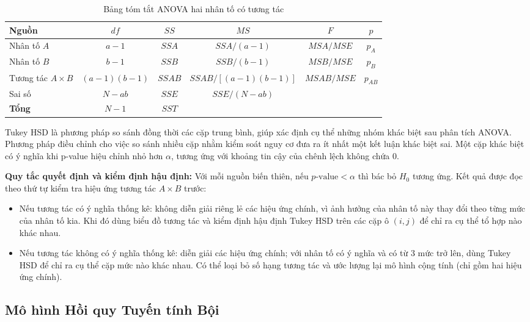 	\begin{table}[htbp]
		\centering
		\vspace{4pt}
		\renewcommand{\arraystretch}{1.6}
		\small
		\begin{tabular}{|l|c|c|c|c|c|}
			\hline
			\textbf{Nguồn} & $df$ & $SS$ & $MS$ & $F$ & $p$ \\ 
			\hline
			Nhân tố $A$ & $a - 1$ & $SSA$ & $SSA/(a-1)$ & $MSA/MSE$ & $p_A$ \\ \hline
			Nhân tố $B$ & $b - 1$ & $SSB$ & $SSB/(b-1)$ & $MSB/MSE$ & $p_B$ \\ \hline
			Tương tác $A \times B$ & $(a-1)(b-1)$ & $SSAB$ & $SSAB/[(a-1)(b-1)]$ & $MSAB/MSE$ & $p_{AB}$ \\ \hline
			Sai số & $N - ab$ & $SSE$ & $SSE/(N-ab)$ & & \\ \hline
			\textbf{Tổng} & $N - 1$ & $SST$ & & & \\ \hline
		\end{tabular}
		\caption{Bảng tóm tắt ANOVA hai nhân tố có tương tác}
		\label{tab:anova2}
	\end{table}
	
	Tukey HSD là phương pháp so sánh đồng thời các cặp trung bình, giúp xác định cụ thể những nhóm khác biệt sau phân tích ANOVA. Phương pháp điều chỉnh cho việc so sánh nhiều cặp nhằm kiểm soát nguy cơ đưa ra ít nhất một kết luận khác biệt sai. Một cặp khác biệt có ý nghĩa khi p-value hiệu chỉnh nhỏ hơn $\alpha$, tương ứng với khoảng tin cậy của chênh lệch không chứa 0.
	
	\textbf{Quy tắc quyết định và kiểm định hậu định:} Với mỗi nguồn biến thiên, nếu $p\text{-value} < \alpha$ thì bác bỏ $H_0$ tương ứng. Kết quả được đọc theo thứ tự kiểm tra hiệu ứng tương tác $A \times B$ trước:
	\begin{itemize}
		\item Nếu tương tác có ý nghĩa thống kê: không diễn giải riêng lẻ các hiệu ứng chính, vì ảnh hưởng của nhân tố này thay đổi theo từng mức của nhân tố kia. Khi đó dùng biểu đồ tương tác và kiểm định hậu định Tukey HSD trên các cặp ô $(i, j)$ để chỉ ra cụ thể tổ hợp nào khác nhau.
		\item Nếu tương tác không có ý nghĩa thống kê: diễn giải các hiệu ứng chính; với nhân tố có ý nghĩa và có từ 3 mức trở lên, dùng Tukey HSD để chỉ ra cụ thể cặp mức nào khác nhau. Có thể loại bỏ số hạng tương tác và ước lượng lại mô hình cộng tính (chỉ gồm hai hiệu ứng chính).
	\end{itemize}
	
	\subsection{Mô hình Hồi quy Tuyến tính Bội }
	
